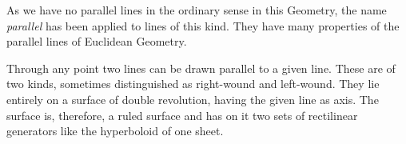 
\label{p68ref}As we have no parallel lines in the ordinary sense in
this Geometry, the name \emph{parallel} has been applied to lines of
this kind. They have many properties of the parallel lines of
Euclidean Geometry.

Through any point two lines can be drawn parallel to a given line.
These are of two kinds, sometimes distinguished as right-wound and
left-wound. They lie entirely on a surface of double revolution,
having the given line as axis. The surface is, therefore, a ruled
surface and has on it two sets of rectilinear generators like the
hyperboloid of one sheet.

